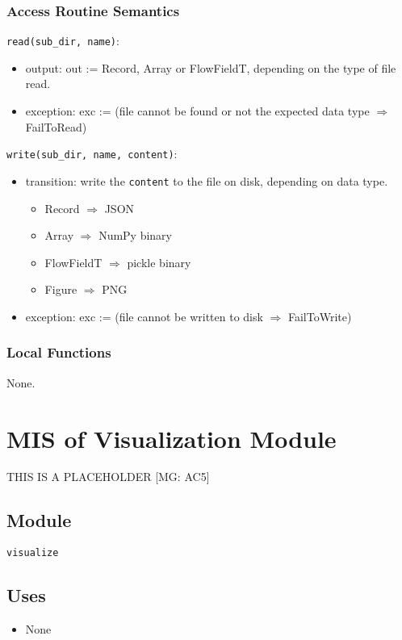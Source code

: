 \documentclass[12pt, titlepage]{article}
\begin{document}
\subsubsection{Access Routine Semantics}

\noindent \texttt{read(sub\_dir, name)}:
\begin{itemize}
\item output: out := Record, Array or FlowFieldT, depending on the type of file read.
\item exception: exc := (file cannot be found or not the expected data type $\Rightarrow$ FailToRead)
\end{itemize}

\noindent \texttt{write(sub\_dir, name, content)}:
\begin{itemize}
\item transition: write the \texttt{content} to the file on disk, depending on data type.
\begin{itemize}
  \item Record $\Rightarrow$ JSON
  \item Array $\Rightarrow$ NumPy binary
  \item FlowFieldT $\Rightarrow$ pickle binary
  \item Figure $\Rightarrow$ PNG
\end{itemize} 
\item exception: exc := (file cannot be written to disk $\Rightarrow$ FailToWrite)
\end{itemize}

\subsubsection{Local Functions}

None.

\newpage
\section{MIS of Visualization Module} \label{mVisual} 

THIS IS A PLACEHOLDER [MG: AC5]

\subsection{Module}
\texttt{visualize}

\subsection{Uses}
\begin{itemize}
\item None
\end{itemize}
\end{document}
